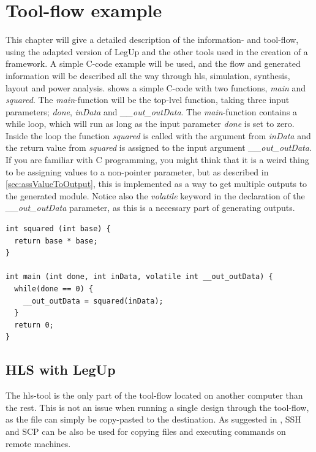 \chapter{\label{chp:toolflowex}Tool-flow example}
This chapter will give a detailed description of the information- and tool-flow, using the adapted version of LegUp and the other tools used in the creation of a framework. A simple C-code example will be used, and the flow and generated information will be described all the way through \gls{hls}, simulation, synthesis, layout and power analysis.  shows a simple C-code with two functions, \textit{main} and \textit{squared}. The \textit{main}-function will be the top-lvel function, taking three input parameters; \textit{done}, \textit{inData} and \textit{\_\_out\_outData}. The \textit{main}-function contains a while loop, which will run as long as the input parameter \textit{done} is set to zero. Inside the loop the function \textit{squared} is called with the argument from \textit{inData} and the return value from \textit{squared} is assigned to the input argument \textit{\_\_out\_outData}. If you are familiar with C programming, you might think that it is a weird thing to be assigning values to a non-pointer parameter, but as described in \cref{sec:assValueToOutput}, this is implemented as a way to get multiple outputs to the generated module. Notice also the \textit{volatile} keyword in the declaration of the \textit{\_\_out\_outData} parameter, as this is a necessary part of generating outputs.
\lstset{language=C++,style=Cstyle}
\begin{lstlisting}[caption={Simple C-code example},label=lst:ccodelisting]
int squared (int base) {
  return base * base;
}

int main (int done, int inData, volatile int __out_outData) {
  while(done == 0) {
    __out_outData = squared(inData);
  }
  return 0;
}
\end{lstlisting}

\section{HLS with LegUp}
The \gls{hls}-tool is the only part of the tool-flow located on another computer than the rest. This is not an issue when running a single design through the tool-flow, as the file can simply be copy-pasted to the destination. As suggested in \cite{holm2015pro}, SSH and SCP can be also be used for copying files and executing commands on remote machines.
